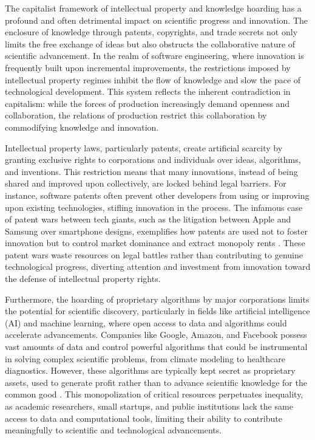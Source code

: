 The capitalist framework of intellectual property and knowledge hoarding has a profound and often detrimental impact on scientific progress and innovation. The enclosure of knowledge through patents, copyrights, and trade secrets not only limits the free exchange of ideas but also obstructs the collaborative nature of scientific advancement. In the realm of software engineering, where innovation is frequently built upon incremental improvements, the restrictions imposed by intellectual property regimes inhibit the flow of knowledge and slow the pace of technological development. This system reflects the inherent contradiction in capitalism: while the forces of production increasingly demand openness and collaboration, the relations of production restrict this collaboration by commodifying knowledge and innovation.

Intellectual property laws, particularly patents, create artificial scarcity by granting exclusive rights to corporations and individuals over ideas, algorithms, and inventions. This restriction means that many innovations, instead of being shared and improved upon collectively, are locked behind legal barriers. For instance, software patents often prevent other developers from using or improving upon existing technologies, stifling innovation in the process. The infamous case of patent wars between tech giants, such as the litigation between Apple and Samsung over smartphone designs, exemplifies how patents are used not to foster innovation but to control market dominance and extract monopoly rents \cite[pp.~25-27]{bessen2014}. These patent wars waste resources on legal battles rather than contributing to genuine technological progress, diverting attention and investment from innovation toward the defense of intellectual property rights.

Furthermore, the hoarding of proprietary algorithms by major corporations limits the potential for scientific discovery, particularly in fields like artificial intelligence (AI) and machine learning, where open access to data and algorithms could accelerate advancements. Companies like Google, Amazon, and Facebook possess vast amounts of data and control powerful algorithms that could be instrumental in solving complex scientific problems, from climate modeling to healthcare diagnostics. However, these algorithms are typically kept secret as proprietary assets, used to generate profit rather than to advance scientific knowledge for the common good \cite[pp.~123-125]{pasquale2015}. This monopolization of critical resources perpetuates inequality, as academic researchers, small startups, and public institutions lack the same access to data and computational tools, limiting their ability to contribute meaningfully to scientific and technological advancements.

